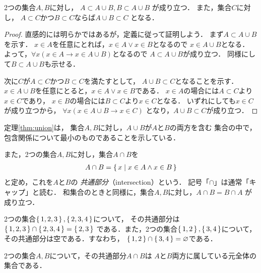    \begin{thm} \label{thm:union}
     2つの集合$A,  B$に対し，
       $A \subset A \cup B , B \subset A \cup B$
     が成り立つ．
     また，集合$C$に対し，
       $A \subset C \text{かつ} B \subset C \text{ならば} A \cup B \subset C$
     となる．
   \end{thm}
   \begin{proof}
     直感的には明らかではあるが，定義に従って証明しよう．
     まず$A \subset A \cup B$
     を示す．
     $x \in A$を任意にとれば，$x \in A \lor x \in B$となるので
     $x \in A \cup B$となる．
     よって，$\forall x( x \in A \to x \in A \cup B)$となるので
     $A \subset A \cup B$が成り立つ．
     同様にして$B \subset A \cup B$も示せる．

     次に$C$が$A \subset C $かつ$B \subset C$を満たすとして，
     $A \cup B \subset C$となることを示す．
     $x \in A \cup B$を任意にとると，$x \in A \lor x \in B$である．
     $x \in A$の場合には$A \subset C$より$x \in C$であり，
     $x \in B$の場合には$B \subset C$より$x \in C$となる．
     いずれにしても$x \in C$が成り立つから，
     $\forall x (x \in A \cup B \to x \in C)$
     となり，$A \cup B \subset C$が成り立つ．
   \end{proof}
   定理\ref{thm:union}は，
   集合$A,  B$に対し，$A \cup B$が$A$と$B$の両方を含む
   集合の中で，包含関係について最小のものであることを示している．
   
   また，2つの集合$A,  B$に対し，集合$A \cap B$を
   \begin{align}
     A \cap B = \set{ x \mid  x \in A \land x \in B}
     \label{eq:kyoutuububun}
   \end{align}
   と定め，これを$A$と$B$の
   \emph{共通部分}（intersection）という．
   記号「$\cap$」は通常「キャップ」と読む．
   和集合のときと同様に，集合$A,  B$に対し，$A \cap B = B \cap A$
   が成り立つ．
   
   \begin{ex} \label{ex:intersection}
     2つの集合$\set{1,  2,  3},  \set{2,  3,  4}$について，
     その共通部分は
     $\set{1,  2,  3} \cap \set{2,  3,  4} = \set{ 2,  3}$
     である．また，2つの集合$\set{1,  2} ,  \set{3,  4}$について，
     その共通部分は空である．すなわち，
     $\set{1,  2} \cap  \set{3,  4} = \varnothing$である．
   \end{ex}
   
   2つの集合$A,  B$について，その共通部分$A \cap B$は
   $A$と$B$両方に属している元全体の集合である．

